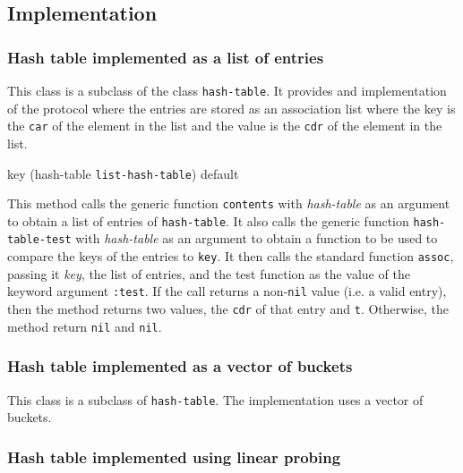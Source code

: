 \subsection{Implementation}

\subsubsection{Hash table implemented as a list of entries}


This class is a subclass of the class \texttt{hash-table}.
It provides and implementation of the protocol where the entries are
stored as an association list where the key is the \texttt{car} of the
element in the list and the value is the \texttt{cdr} of the element
in the list.

{\small{} {key (hash-table {\tt list-hash-table})
    \optional default}
}

This method calls the generic function \texttt{contents} with
\textit{hash-table} as an argument to obtain a list of entries of
\texttt{hash-table}.  It also calls the generic function
\texttt{hash-table-test} with \textit{hash-table} as an argument to
obtain a function to be used to compare the keys of the entries to
\texttt{key}.  It then calls the standard \commonlisp{} function
\texttt{assoc}, passing it \textit{key}, the list of entries, and the
test function as the value of the keyword argument \texttt{:test}.  If
the call returns a non-\texttt{nil} value (i.e. a valid entry), then
the method returns two values, the \texttt{cdr} of that entry and
\texttt{t}.  Otherwise, the method return \texttt{nil} and
\texttt{nil}.

\subsubsection{Hash table implemented as a vector of buckets}


This class is a subclass of \texttt{hash-table}.  The implementation
uses a vector of buckets.

\subsubsection{Hash table implemented using linear probing}


